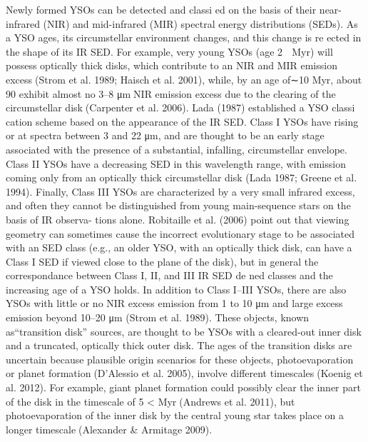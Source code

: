 \documentclass[../main.tex]{subfiles}
\begin{document}
{Newly formed YSOs can be detected and classi ed on the
basis of their near-infrared (NIR) and mid-infrared (MIR)
spectral energy distributions (SEDs). As a YSO ages, its
circumstellar environment changes, and this change is re ected
in the shape of its IR SED. For example, very young YSOs (age
2  Myr) will possess optically thick disks, which contribute to
an NIR and MIR emission excess(Strom et al. 1989; Haisch
et al. 2001), while, by an age of∼10 Myr, about 90%
exhibit almost no 3–8 μmNIR emission excess due to the
clearing of the circumstellar disk(Carpenter et al. 2006).
Lada (1987) established a YSO classi cation scheme based
on the appearance of the IR SED. Class I YSOs have rising or
at spectra between 3 and 22 μm, and are thought to be an early
stage associated with the presence of a substantial, infalling,
circumstellar envelope. Class II YSOs have a decreasing SED
in this wavelength range, with emission coming only from an
optically thick circumstellar disk (Lada 1987; Greene et al.
1994). Finally, Class III YSOs are characterized by a very
small infrared excess, and often they cannot be distinguished
from young main-sequence stars on the basis of IR observa-
tions alone. Robitaille et al. (2006) point out that viewing
geometry can sometimes cause the incorrect evolutionary stage
to be associated with an SED class (e.g., an older YSO, with an
optically thick disk, can have a Class I SED if viewed close to
the plane of the disk), but in general the correspondance
between Class I, II, and III IR SED de ned classes and the
increasing age of a YSO holds.
In addition to Class I–III YSOs, there are also YSOs with little
or no NIR excess emission from 1 to 10 μm and large excess
emission beyond 10–20 μm (Strom et al. 1989). These objects,
known as“transition disk” sources, are thought to be YSOs with
a cleared-out inner disk and a truncated, optically thick outer
disk. The ages of the transition disks are uncertain because
plausible origin scenarios for these objects, photoevaporation or
planet formation(D’Alessio et al. 2005), involve different
timescales(Koenig et al. 2012). For example, giant planet
formation could possibly clear the inner part of the disk in the timescale of 5
< Myr(Andrews et al. 2011), but photoevaporation
of the inner disk by the central young star takes place on a longer
timescale(Alexander & Armitage 2009).

}
\end{document}
